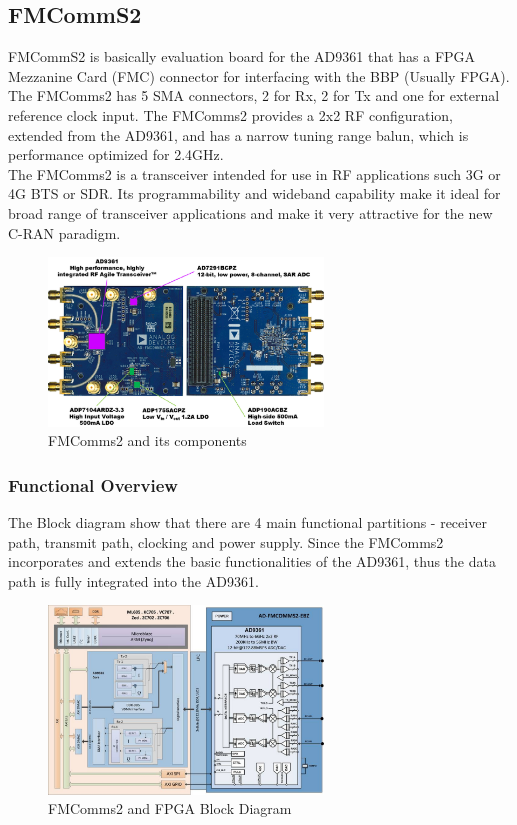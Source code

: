 \subsection{FMCommS2}

FMCommS2 is basically evaluation board for the AD9361 that has a FPGA Mezzanine
Card (FMC) connector for interfacing with the BBP (Usually FPGA). The FMComms2
has 5 SMA connectors, 2 for Rx, 2 for Tx and one for external reference clock
input. The FMComms2 provides a 2x2 RF configuration, extended from the AD9361,
and has  a narrow tuning range balun, which is performance optimized for 2.4GHz.\\

The FMComms2 is a transceiver intended for use in RF applications such 3G or 4G
BTS or SDR. Its programmability and wideband capability make it ideal for broad
range of transceiver applications and make it very attractive for the new C-RAN
paradigm.

\begin{figure}[htbp]
    \centering
    \includegraphics[width=0.65\textwidth]{./figures/fmcomms2_pic}
    \caption{ FMComms2 and its components
    \label{fig:fmcomm}}
\end{figure}


\subsubsection{Functional Overview}

The Block diagram show that there are 4 main functional partitions - receiver
path, transmit path, clocking and power supply. Since the FMComms2 incorporates
and extends the basic functionalities of the AD9361, thus the data path is fully
integrated into the AD9361.

\begin{figure}[htbp]
    \centering
    \includegraphics[width=0.65\textwidth]{./figures/fmcomms2_bd}
    \caption{ FMComms2 and FPGA Block Diagram
    \label{fig:fmcommbd}}
\end{figure}



